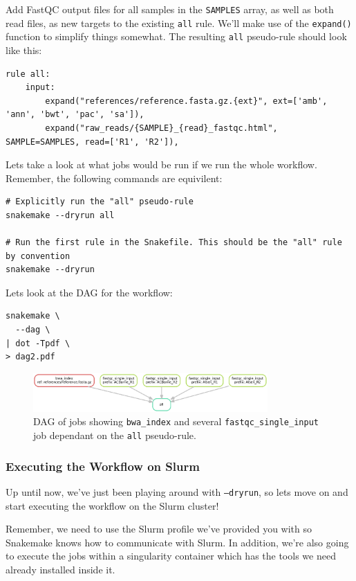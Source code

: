 Add FastQC output files for all samples in the \texttt{SAMPLES} array, as well as both read files, as new targets to the existing \texttt{all} rule. We'll make use of the \texttt{expand()}
function to simplify things somewhat. The resulting \texttt{all} pseudo-rule should look like this:

\begin{lstlisting}
rule all:
	input:
		expand("references/reference.fasta.gz.{ext}", ext=['amb', 'ann', 'bwt', 'pac', 'sa']),
		expand("raw_reads/{SAMPLE}_{read}_fastqc.html", SAMPLE=SAMPLES, read=['R1', 'R2']),
\end{lstlisting}

Lets take a look at what jobs would be run if we run the whole workflow. Remember, the following commands are equivilent:

\begin{lstlisting}
# Explicitly run the "all" pseudo-rule
snakemake --dryrun all

# Run the first rule in the Snakefile. This should be the "all" rule by convention
snakemake --dryrun
\end{lstlisting}

Lets look at the DAG for the workflow:

\begin{lstlisting}
snakemake \
  --dag \
| dot -Tpdf \
> dag2.pdf
\end{lstlisting}

\begin{figure}[H]
\centering
\includegraphics[width=0.8\textwidth]{handout/dag2.pdf}
\caption{DAG of jobs showing \texttt{bwa\_index} and several \texttt{fastqc\_single\_input} job dependant on the \texttt{all} pseudo-rule.}
\label{fig:dag2}
\end{figure}


\subsubsection{Executing the Workflow on Slurm}

Up until now, we've just been playing around with \texttt{--dryrun}, so lets move on and start executing the workflow on the Slurm cluster!

Remember, we need to use the Slurm profile we've provided you with so Snakemake knows how to communicate with Slurm. In addition, we're
also going to execute the jobs within a singularity container which has the tools we need already installed inside it.

